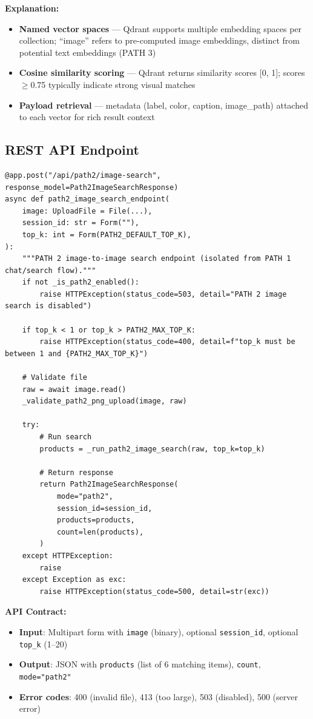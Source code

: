 \textbf{Explanation:}
\begin{itemize}
    \item \textbf{Named vector spaces} --- Qdrant supports multiple embedding spaces per collection; ``image'' refers to pre-computed image embeddings, distinct from potential text embeddings (PATH 3)
    \item \textbf{Cosine similarity scoring} --- Qdrant returns similarity scores [0, 1]; scores $\geq$0.75 typically indicate strong visual matches
    \item \textbf{Payload retrieval} --- metadata (label, color, caption, image\_path) attached to each vector for rich result context
\end{itemize}

\subsection{REST API Endpoint}

\begin{lstlisting}[caption={FastAPI PATH 2 Endpoint --- api/main.py}]
@app.post("/api/path2/image-search", response_model=Path2ImageSearchResponse)
async def path2_image_search_endpoint(
    image: UploadFile = File(...),
    session_id: str = Form(""),
    top_k: int = Form(PATH2_DEFAULT_TOP_K),
):
    """PATH 2 image-to-image search endpoint (isolated from PATH 1 chat/search flow)."""
    if not _is_path2_enabled():
        raise HTTPException(status_code=503, detail="PATH 2 image search is disabled")
    
    if top_k < 1 or top_k > PATH2_MAX_TOP_K:
        raise HTTPException(status_code=400, detail=f"top_k must be between 1 and {PATH2_MAX_TOP_K}")
    
    # Validate file
    raw = await image.read()
    _validate_path2_png_upload(image, raw)
    
    try:
        # Run search
        products = _run_path2_image_search(raw, top_k=top_k)
        
        # Return response
        return Path2ImageSearchResponse(
            mode="path2",
            session_id=session_id,
            products=products,
            count=len(products),
        )
    except HTTPException:
        raise
    except Exception as exc:
        raise HTTPException(status_code=500, detail=str(exc))
\end{lstlisting}

\textbf{API Contract:}
\begin{itemize}
    \item \textbf{Input}: Multipart form with \texttt{image} (binary), optional \texttt{session\_id}, optional \texttt{top\_k} (1--20)
    \item \textbf{Output}: JSON with \texttt{products} (list of 6 matching items), \texttt{count}, \texttt{mode="path2"}
    \item \textbf{Error codes}: 400 (invalid file), 413 (too large), 503 (disabled), 500 (server error)
\end{itemize}

